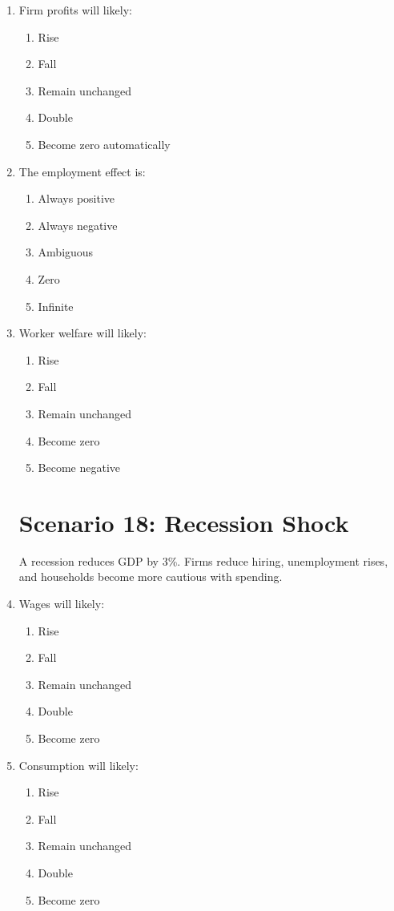 \documentclass[12pt]{article}
\begin{document}
\begin{enumerate}[label=\textbf{\arabic*.}]
\item Firm profits will likely:
\begin{enumerate}[label=\Alph*.]
\item Rise
\item Fall
\item Remain unchanged
\item Double
\item Become zero automatically
\end{enumerate}

\item The employment effect is:
\begin{enumerate}[label=\Alph*.]
\item Always positive
\item Always negative
\item Ambiguous
\item Zero
\item Infinite
\end{enumerate}

\item Worker welfare will likely:
\begin{enumerate}[label=\Alph*.]
\item Rise
\item Fall
\item Remain unchanged
\item Become zero
\item Become negative
\end{enumerate}

\section*{Scenario 18: Recession Shock}

A recession reduces GDP by 3\%. Firms reduce hiring, unemployment rises, and households become more cautious with spending.

\item Wages will likely:
\begin{enumerate}[label=\Alph*.]
\item Rise
\item Fall
\item Remain unchanged
\item Double
\item Become zero
\end{enumerate}

\item Consumption will likely:
\begin{enumerate}[label=\Alph*.]
\item Rise
\item Fall
\item Remain unchanged
\item Double
\item Become zero
\end{enumerate}


\end{enumerate}
\end{document}
